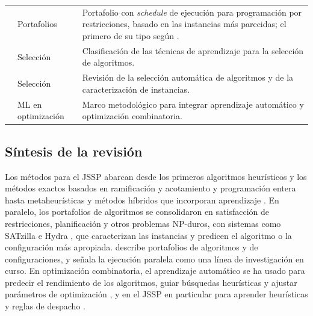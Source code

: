 \begin{table}[H]
\begin{tabularx}{\textwidth}{>{\raggedright\arraybackslash}p{}
                               >{\raggedright\arraybackslash}p{}
                               >{\raggedright\arraybackslash}X}
    \citet{omahony2008cphydra} & Portafolios & Portafolio con
      \textit{schedule} de ejecución para programación por restricciones,
      basado en las instancias más parecidas; el primero de su tipo según
      \citet{amadini2015sunnycp}. \\
    \citet{kotthoff2014} & Selección & Clasificación de las técnicas de
      aprendizaje para la selección de algoritmos. \\
    \citet{kerschke2019} & Selección & Revisión de la selección automática de
      algoritmos y de la caracterización de instancias. \\
    \citet{bengio2021} & ML en optimización & Marco metodológico para
      integrar aprendizaje automático y optimización combinatoria. \\
    \bottomrule
  \end{tabularx}
\end{table}

\subsection{Síntesis de la revisión}
\label{sec:evolucion_jssp}
\label{sec:ml_co}

Los métodos para el JSSP abarcan desde los primeros algoritmos heurísticos
\citep{giffler1960} y los métodos exactos basados en ramificación y
acotamiento y programación entera hasta metaheurísticas y métodos híbridos
que incorporan aprendizaje \citep{pinedo2022}. En paralelo, los portafolios de
algoritmos se consolidaron en satisfacción de restricciones, planificación y
otros problemas NP-duros, con sistemas como SATzilla \citep{xu2008satzilla}
e Hydra \citep{xu2010hydra}, que caracterizan las instancias y predicen el
algoritmo o la configuración más apropiada. \citet{kotthoff2014} describe
portafolios de algoritmos y de configuraciones, y señala la ejecución paralela
como una línea de investigación en curso. En optimización combinatoria, el aprendizaje automático se ha usado para
predecir el rendimiento de los algoritmos, guiar búsquedas heurísticas y
ajustar parámetros de optimización \citep{bengio2021}, y en el JSSP en
particular para aprender heurísticas y reglas de despacho
\citep{smit2024gnn, xu2025learn}.

